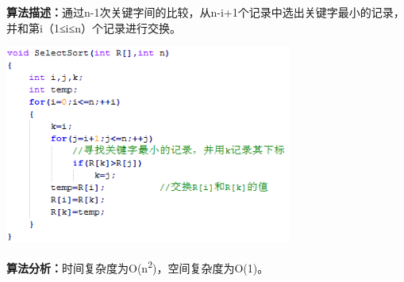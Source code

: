 {\textbf{算法描述：}通过n-1次关键字间的比较，从n-i+1个记录中选出关键字最小的记录，并和第i（1≤i≤n）个记录进行交换。}{}

\includegraphics[width=3.70833in,height=2.57292in]{png-jpeg-pics/F7F77927D9E9F140E2C089F189B2BB84.png}

{\textbf{算法分析：}时间复杂度为O(n}\textsuperscript{2}{)，空间复杂度为O(1)。}
